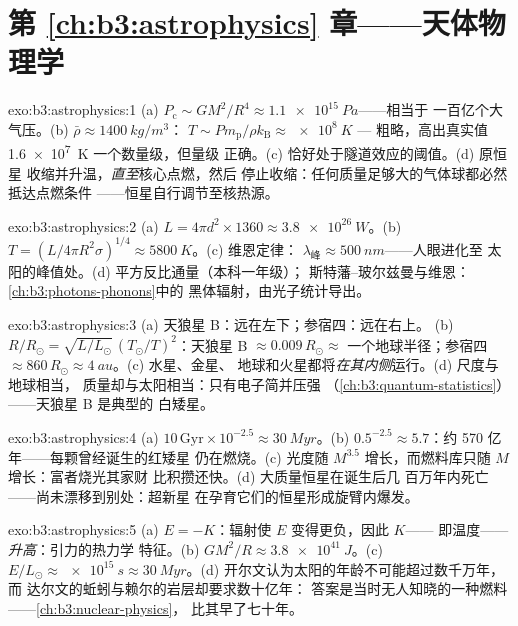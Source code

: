 \section*{第 \ref{ch:b3:astrophysics} 章——天体物理学}

\begin{solution}{exo:b3:astrophysics:1}
(a) $P_{\text{c}} \sim GM^2/R^4 \approx \qty{1.1e15}{Pa}$——相当于
一百亿个大气压。(b) $\bar\rho \approx \qty{1400}{kg/m^3}$：
$T \sim P m_{\text{p}}/\rho k_{\text{B}} \approx \qty{e8}{K}$ ---
粗略，高出真实值 \qty{1.6e7}{K} 一个数量级，但量级
正确。(c) 恰好处于隧道效应的阈值。(d) 原恒星
收缩并升温，\emph{直至}核心点燃，然后
停止收缩：任何质量足够大的气体球都必然抵达点燃条件
——恒星自行调节至核热源。
\end{solution}

\begin{solution}{exo:b3:astrophysics:2}
(a) $L = 4\pi d^2\times1360 \approx \qty{3.8e26}{W}$。(b) $T =
(L/4\pi R^2\sigma)^{1/4} \approx \qty{5800}{K}$。(c) 维恩定律：
$\lambda_{\text{峰}} \approx \qty{500}{nm}$——人眼进化至
太阳的峰值处。(d) 平方反比通量（本科一年级）；
斯特藩–玻尔兹曼与维恩：\cref{ch:b3:photons-phonons}中的
黑体辐射，由光子统计导出。
\end{solution}

\begin{solution}{exo:b3:astrophysics:3}
(a) 天狼星 B：远在左下；参宿四：远在右上。
(b) $R/R_\odot = \sqrt{L/L_\odot}\,(T_\odot/T)^2$：天狼星 B
$\approx 0.009\,R_\odot \approx$ 一个地球半径；参宿四
$\approx 860\,R_\odot \approx \qty{4}{au}$。(c) 水星、金星、
地球和火星都将\emph{在其内侧}运行。(d) 尺度与地球相当，
质量却与太阳相当：只有电子简并压强
（\cref{ch:b3:quantum-statistics}）——天狼星 B 是典型的
白矮星。
\end{solution}

\begin{solution}{exo:b3:astrophysics:4}
(a) $10\,\text{Gyr}\times10^{-2.5} \approx \qty{30}{Myr}$。(b)
$0.5^{-2.5} \approx 5.7$：约 570 亿年——每颗曾经诞生的红矮星
仍在燃烧。(c) 光度随
$M^{3.5}$ 增长，而燃料库只随 $M$ 增长：富者烧光其家财
比积攒还快。(d) 大质量恒星在诞生后几
百万年内死亡——尚未漂移到别处：超新星
在孕育它们的恒星形成旋臂内爆发。
\end{solution}

\begin{solution}{exo:b3:astrophysics:5}
(a) $E = -K$：辐射使 $E$ 变得更负，因此 $K$——
即温度——\emph{升高}：引力的热力学
特征。(b) $GM^2/R \approx \qty{3.8e41}{J}$。(c)
$E/L_\odot \approx \qty{e15}{s} \approx \qty{30}{Myr}$。(d)
开尔文认为太阳的年龄不可能超过数千万年，而
达尔文的蚯蚓与赖尔的岩层却要求数十亿年：
答案是当时无人知晓的一种燃料——\cref{ch:b3:nuclear-physics}，
比其早了七十年。
\end{solution}

